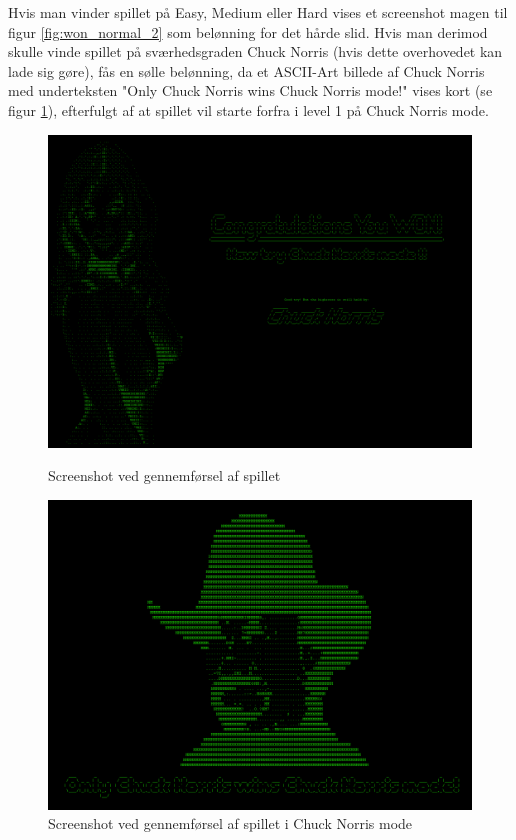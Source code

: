 Hvis man vinder spillet på Easy, Medium eller Hard vises et screenshot magen til figur \ref{fig:won_normal_2} som belønning for det hårde slid. Hvis man derimod skulle vinde spillet på sværhedsgraden Chuck Norris (hvis dette overhovedet kan lade sig gøre), fås en sølle belønning, da et ASCII-Art billede af Chuck Norris med underteksten "Only Chuck Norris wins Chuck Norris mode!" vises kort (se figur \ref{fig:won_chuck}), efterfulgt af at spillet vil starte forfra i level 1 på Chuck Norris mode.\\

\begin{figure}[h!]
\begin{minipage}[b]{0.49\textwidth}
\includegraphics[width=\linewidth]{figs/screenshots/won_normal.png}
\caption{Screenshot ved gennemførsel af spillet}
\label{fig:won_normal_2}
\end{minipage}\hfill
\begin{minipage}[b]{0.49\textwidth}
\includegraphics[width=\linewidth]{figs/screenshots/won_chuck_crop.png}
\caption{Screenshot ved gennemførsel af spillet i Chuck Norris mode}
\label{fig:won_chuck}
\end{minipage}\hfill
\end{figure}